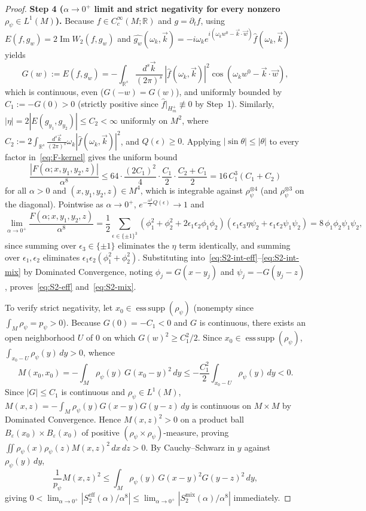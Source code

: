 \documentclass[11pt,a4paper]{article}
\theoremstyle{definition}
\theoremstyle{remark}
\newcommand{\RR}{\mathbb{R}}
\newcommand{\esssupp}{\operatorname{ess\,supp}}
\begin{document}
\begin{proof}
\medskip\noindent\textbf{Step 4 ($\alpha\to 0^+$ limit and strict negativity for every nonzero $\rho_\psi\in L^1(M)$).}
Because $f\in C_c^\infty(M;\RR)$ and $g=\partial_t f$, using $E(f,g_w) = 2\operatorname{Im}W_2(f,g_w)$ and $\widehat{g_w}(\omega_k,\vec{k}) = -i\omega_k e^{i(\omega_k w^0 - \vec{k}\cdot\vec{w})}\widehat{f}(\omega_k,\vec{k})$ yields
\begin{equation}\label{eq:G-kernel}
G(w) := E(f, g_w) = -\int_{\RR^s}\frac{d^s\vec{k}}{(2\pi)^s}\,|\widehat{f}(\omega_k,\vec{k})|^2 \cos(\omega_k w^0 - \vec{k}\cdot\vec{w}),
\end{equation}
which is continuous, even ($G(-w)=G(w)$), and uniformly bounded by $C_1 := -G(0) > 0$ (strictly positive since $\widehat{f}|_{H_m^+}\not\equiv 0$ by Step~1). Similarly, $|\eta| = 2|E(g_{y_1},g_{y_2})| \le C_2 < \infty$ uniformly on $M^2$, where $C_2 := 2\int_{\RR^s}\frac{d^s\vec{k}}{(2\pi)^s}\omega_k|\widehat{f}(\omega_k,\vec{k})|^2$, and $Q(\epsilon)\ge 0$. Applying $|\sin\theta|\le |\theta|$ to every factor in~\eqref{eq:F-kernel} gives the uniform bound
\[
\frac{|F(\alpha; x,y_1,y_2,z)|}{\alpha^8} \le 64\cdot \frac{(2C_1)^2}{4}\cdot\frac{C_1}{2}\cdot\frac{C_2+C_1}{2} = 16\,C_1^3(C_1+C_2)
\]
for all $\alpha > 0$ and $(x,y_1,y_2,z)\in M^4$, which is integrable against $\rho_\psi^{\otimes 4}$ (and $\rho_\psi^{\otimes 3}$ on the diagonal). Pointwise as $\alpha\to 0^+$, $e^{-\frac{\alpha^2}{2}Q(\epsilon)}\to 1$ and
\[
\lim_{\alpha\to 0^+}\frac{F(\alpha; x,y_1,y_2,z)}{\alpha^8}
= \frac{1}{2}\sum_{\epsilon\in\{\pm 1\}^3}(\phi_1^2 + \phi_2^2 + 2\epsilon_1\epsilon_2\phi_1\phi_2)(\epsilon_1\epsilon_3\eta\psi_2 + \epsilon_1\epsilon_2\psi_1\psi_2)
= 8\,\phi_1\phi_2\psi_1\psi_2,
\]
since summing over $\epsilon_3\in\{\pm 1\}$ eliminates the $\eta$ term identically, and summing over $\epsilon_1,\epsilon_2$ eliminates $\epsilon_1\epsilon_2(\phi_1^2+\phi_2^2)$. Substituting into~\eqref{eq:S2-int-eff}--\eqref{eq:S2-int-mix} by Dominated Convergence, noting $\phi_j = G(x-y_j)$ and $\psi_j = -G(y_j-z)$, proves~\eqref{eq:S2-eff} and~\eqref{eq:S2-mix}.

To verify strict negativity, let $x_0\in\esssupp(\rho_\psi)$ (nonempty since $\int_M\rho_\psi = p_\psi > 0$). Because $G(0) = -C_1 < 0$ and $G$ is continuous, there exists an open neighborhood $U$ of $0$ on which $G(w)^2 \ge C_1^2/2$. Since $x_0\in\esssupp(\rho_\psi)$, $\int_{x_0 - U}\rho_\psi(y)\,dy > 0$, whence
\[
M(x_0, x_0) = -\int_M \rho_\psi(y)\,G(x_0 - y)^2\,dy \le -\frac{C_1^2}{2}\int_{x_0 - U}\rho_\psi(y)\,dy < 0.
\]
Since $|G|\le C_1$ is continuous and $\rho_\psi\in L^1(M)$, $M(x,z) = -\int_M \rho_\psi(y)G(x-y)G(y-z)\,dy$ is continuous on $M\times M$ by Dominated Convergence. Hence $M(x,z)^2 > 0$ on a product ball $B_\varepsilon(x_0)\times B_\varepsilon(x_0)$ of positive $(\rho_\psi\times\rho_\psi)$-measure, proving $\iint \rho_\psi(x)\rho_\psi(z)M(x,z)^2\,dx\,dz > 0$. By Cauchy--Schwarz in $y$ against $\rho_\psi(y)\,dy$,
\[
\frac{1}{p_\psi}M(x,z)^2 \le \int_M \rho_\psi(y)\,G(x-y)^2 G(y-z)^2\,dy,
\]
giving $0 < \lim_{\alpha\to 0^+}|S_2^{\mathrm{eff}}(\alpha)/\alpha^8| \le \lim_{\alpha\to 0^+}|S_2^{\mathrm{mix}}(\alpha)/\alpha^8|$ immediately.


\end{proof}
\end{document}
